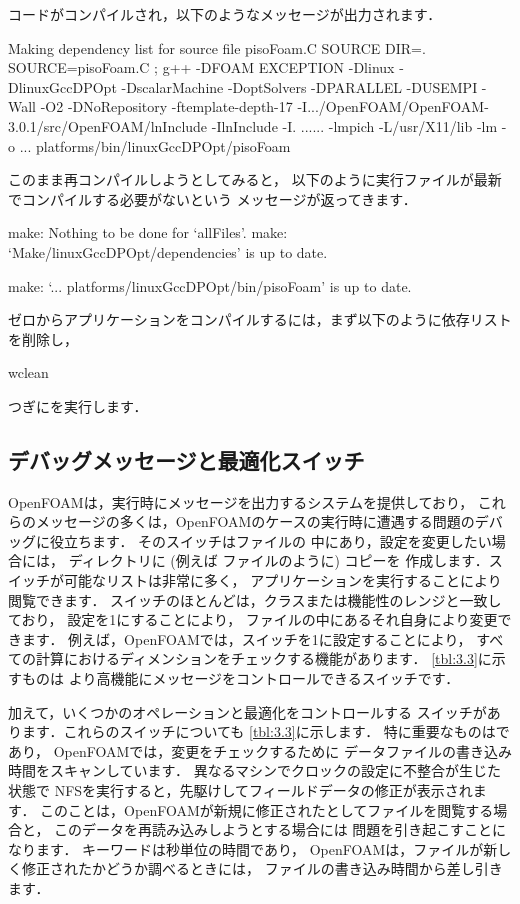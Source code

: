 コードがコンパイルされ，以下のようなメッセージが出力されます．
\begin{OFverbatim}[file]
Making dependency list for source file pisoFoam.C
SOURCE DIR=.
SOURCE=pisoFoam.C ;
g++ -DFOAM EXCEPTION -Dlinux -DlinuxGccDPOpt
-DscalarMachine -DoptSolvers -DPARALLEL -DUSEMPI -Wall -O2 -DNoRepository
-ftemplate-depth-17 -I.../OpenFOAM/OpenFOAM-3.0.1/src/OpenFOAM/lnInclude
-IlnInclude
-I.
......
-lmpich -L/usr/X11/lib -lm
-o ... platforms/bin/linuxGccDPOpt/pisoFoam
\end{OFverbatim}
このまま再コンパイルしようとしてみると，
以下のように実行ファイルが最新でコンパイルする必要がないという
メッセージが返ってきます．
\begin{OFverbatim}[file]
make: Nothing to be done for `allFiles'.
make: `Make/linuxGccDPOpt/dependencies' is up to date.

make: `... platforms/linuxGccDPOpt/bin/pisoFoam'
is up to date.
\end{OFverbatim}
ゼロからアプリケーションをコンパイルするには，まず以下のように依存リストを削除し，
\begin{OFverbatim}[terminal]
wclean
\end{OFverbatim}
つぎにを実行します．


\subsection{デバッグメッセージと最適化スイッチ}
\label{ssec:3.2.5}
OpenFOAMは，実行時にメッセージを出力するシステムを提供しており，
これらのメッセージの多くは，OpenFOAMのケースの実行時に遭遇する問題のデバッグに役立ちます．
そのスイッチはファイルの
中にあり，設定を変更したい場合には，
ディレクトリに (例えば
ファイルのように) コピーを
作成します．スイッチが可能なリストは非常に多く，
アプリケーションを実行することにより閲覧できます．
スイッチのほとんどは，クラスまたは機能性のレンジと一致しており，
設定を1にすることにより，
ファイルの中にあるそれ自身により変更できます．
例えば，OpenFOAMでは，スイッチを1に設定することにより，
すべての計算におけるディメンションをチェックする機能があります．
\autoref{tbl:3.3}に示すものは
より高機能にメッセージをコントロールできるスイッチです．

加えて，いくつかのオペレーションと最適化をコントロールする
スイッチがあります．これらのスイッチについても
\autoref{tbl:3.3}に示します．
特に重要なものはであり，
OpenFOAMでは，変更をチェックするために
データファイルの書き込み時間をスキャンしています．
異なるマシンでクロックの設定に不整合が生じた状態で
NFSを実行すると，先駆けしてフィールドデータの修正が表示されます．
このことは，OpenFOAMが新規に修正されたとしてファイルを閲覧する場合と，
このデータを再読み込みしようとする場合には
問題を引き起こすことになります．
キーワードは秒単位の時間であり，
OpenFOAMは，ファイルが新しく修正されたかどうか調べるときには，
ファイルの書き込み時間から差し引きます．


